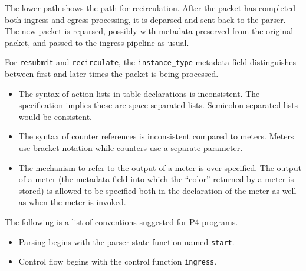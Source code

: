 \documentclass[12pt]{article}
\begin{document}
The lower path shows the path for recirculation.  After the packet has
completed both ingress and egress processing, it is deparsed and sent
back to the parser.  The new packet is reparsed, possibly with
metadata preserved from the original packet, and passed to the ingress
pipeline as usual.

For \texttt{resubmit} and \texttt{recirculate}, the
\texttt{instance_type} metadata field distinguishes between first and
later times the packet is being processed.



\begin{itemize}
\item The syntax of action lists in table declarations is inconsistent. The specification implies these are space-separated lists. Semicolon-separated lists would be consistent.
\item The syntax of counter references is inconsistent compared to meters. Meters use bracket notation while counters use a separate parameter.
\item The mechanism to refer to the output of a meter is over-specified. The output of a meter (the metadata field into which the ``color'' returned by a meter is stored) is allowed to be specified both in the declaration of the meter as well as when the meter is invoked.
\end{itemize}



The following is a list of conventions suggested for P4 programs.

\begin{itemize}
\item
Parsing begins with the parser state function named \texttt{start}.
\item
Control flow begins with the control function \texttt{ingress}.
\end{itemize}


\end{document}
